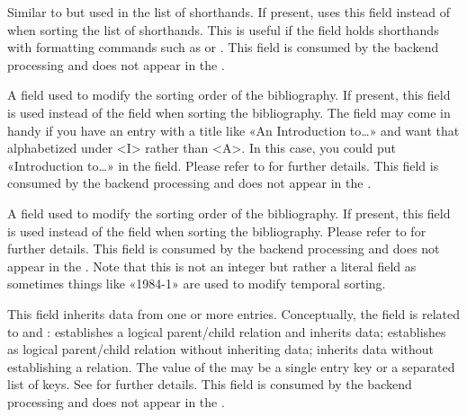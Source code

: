 \documentclass{ltxdockit}[2011/03/25]
\newcommand*{\biblatex}{\sty{biblatex}\xspace}
\begin{document}
\begin{fieldlist}

Similar to  but used in the list of shorthands. If present, \biblatex uses this field instead of  when sorting the list of shorthands. This is useful if the  field holds shorthands with formatting commands such as  or . This field is consumed by the backend processing and does not appear in the .


A field used to modify the sorting order of the bibliography. If present, this field is used instead of the  field when sorting the bibliography. The  field may come in handy if you have an entry with a title like «An Introduction to\dots» and want that alphabetized under <I> rather than <A>. In this case, you could put «Introduction to\dots» in the  field. Please refer to  for further details. This field is consumed by the backend processing and does not appear in the .


A field used to modify the sorting order of the bibliography. If present, this field is used instead of the  field when sorting the bibliography. Please refer to  for further details. This field is consumed by the backend processing and does not appear in the . Note that this is not an integer but rather a literal field as sometimes things like «1984-1» are used to modify temporal sorting.


This field inherits data from one or more  entries. Conceptually, the  field is related to  and :  establishes a logical parent/child relation and inherits data;  establishes as logical parent/child relation without inheriting data;  inherits data without establishing a relation. The value of the  may be a single entry key or a separated list of keys. See  for further details. This field is consumed by the backend processing and does not appear in the .



\end{fieldlist}
\end{document}
